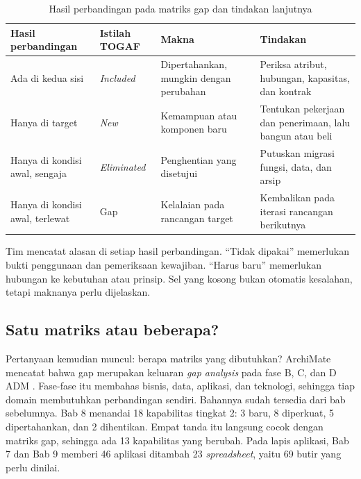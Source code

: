 \begin{table}[!htb]
  \centering
  \caption{Hasil perbandingan pada matriks gap dan tindakan lanjutnya}
  \label{tab:ch11-baca-matriks}
  \small
  \begin{tabularx}{\textwidth}{>{\raggedright\arraybackslash}p{3.1cm}>{\raggedright\arraybackslash}p{2.0cm}>{\raggedright\arraybackslash}X>{\raggedright\arraybackslash}X}
    \hline
    \textbf{Hasil perbandingan} & \textbf{Istilah TOGAF} & \textbf{Makna} & \textbf{Tindakan} \\ \hline
    Ada di kedua sisi & \textit{Included} & Dipertahankan, mungkin dengan perubahan &
      Periksa atribut, hubungan, kapasitas, dan kontrak \\ \hline
    Hanya di target & \textit{New} & Kemampuan atau komponen baru &
      Tentukan pekerjaan dan penerimaan, lalu bangun atau beli \\ \hline
    Hanya di kondisi awal, sengaja & \textit{Eliminated} & Penghentian yang disetujui &
      Putuskan migrasi fungsi, data, dan arsip \\ \hline
    Hanya di kondisi awal, terlewat & Gap & Kelalaian pada rancangan target &
      Kembalikan pada iterasi rancangan berikutnya \\ \hline
  \end{tabularx}
\end{table}

Tim mencatat alasan di setiap hasil perbandingan. ``Tidak dipakai'' memerlukan bukti
penggunaan dan pemeriksaan kewajiban. ``Harus baru'' memerlukan hubungan ke kebutuhan
atau prinsip. Sel yang kosong bukan otomatis kesalahan, tetapi maknanya perlu
dijelaskan.

\subsection*{Satu matriks atau beberapa?}

Pertanyaan kemudian muncul: berapa matriks yang dibutuhkan? ArchiMate mencatat bahwa
gap merupakan keluaran \textit{gap analysis} pada fase B, C, dan D ADM
\cite{archimate32}. Fase-fase itu membahas bisnis, data, aplikasi, dan teknologi,
sehingga tiap domain membutuhkan perbandingan sendiri. Bahannya sudah tersedia dari
bab sebelumnya. Bab 8 menandai 18 kapabilitas tingkat 2: 3 baru, 8 diperkuat, 5
dipertahankan, dan 2 dihentikan. Empat tanda itu langsung cocok dengan matriks gap,
sehingga ada 13 kapabilitas yang berubah. Pada lapis aplikasi, Bab 7 dan Bab 9
memberi 46 aplikasi ditambah 23 \textit{spreadsheet}, yaitu 69 butir yang perlu
dinilai.

